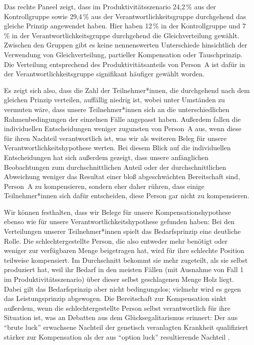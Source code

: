 \documentclass[justified,nobib,nohyper,symmetric,twoside]{tufte-book}
\begin{document}
Das rechte Paneel zeigt, dass im Produktivitätsszenario 24,2\,\% aus der Kontrollgruppe sowie 29,4\,\% aus der Verantwortlichkeitsgruppe durchgehend das gleiche Prinzip angewendet haben.
Hier haben 12\,\% in der Kontrollgruppe und 7\,\% in der Verantwortlichkeitsgruppe durchgehend die Gleichverteilung gewählt.
Zwischen den Gruppen gibt es keine nennenswerten Unterschiede hinsichtlich der Verwendung von Gleichverteilung, partieller Kompensation oder Tauschprinzip.
Die Verteilung entsprechend des Produktivitätsanteils von Person~A ist dafür in der Verantwortlichkeitsgruppe signifikant häufiger gewählt worden.

Es zeigt sich also, dass die Zahl der Teilnehmer*innen, die durchgehend nach dem gleichen Prinzip verteilen, auffällig niedrig ist, wobei unter Umständen zu vermuten wäre, dass unsere Teilnehmer*innen sich an die unterschiedlichen Rahmenbedingungen der einzelnen Fälle angepasst haben.
Außerdem fallen die individuellen Entscheidungen weniger zugunsten von Person~A aus, wenn diese für ihren Nachteil verantwortlich ist, was wir als weiteren Beleg für unsere Verantwortlichkeitshypothese werten.
Bei diesem Blick auf die individuellen Entscheidungen hat sich außerdem gezeigt, dass unsere anfänglichen Beobachtungen zum durchschnittlichen Anteil oder der durchschnittlichen Abweichung weniger das Resultat einer bloß abgeschwächten Bereitschaft sind, Person~A zu kompensieren, sondern eher daher rühren, dass einige Teilnehmer*innen sich dafür entscheiden, diese Person gar nicht zu kompensieren.

Wir können festhalten, dass wir Belege für unsere Kompensationshypothese ebenso wie für unsere Verantwortlichkeitshypothese gefunden haben: Bei den Verteilungen unserer Teilnehmer*innen spielt das Bedarfsprinzip eine deutliche Rolle.
Die schlechtergestellte Person, die also entweder mehr benötigt oder weniger zur verfügbaren Menge beigetragen hat, wird für ihre schlechte Position teilweise kompensiert.
Im Durchschnitt bekommt sie mehr zugeteilt, als sie selbst produziert hat, weil ihr Bedarf in den meisten Fällen (mit Ausnahme von Fall 1 im Produktivitätsszenario) über dieser selbst geschlagenen Menge Holz liegt.
Dabei gilt das Bedarfsprinzip aber nicht bedingungslos; vielmehr wird es gegen das Leistungsprinzip abgewogen.
Die Bereitschaft zur Kompensation sinkt außerdem, wenn die schlechtergestellte Person selbst verantwortlich für ihre Situation ist, was an Debatten aus dem Glücks\-egalitarismus erinnert: Der aus \enquote{brute luck} erwachsene Nachteil der genetisch veranlagten Krankheit qualifiziert stärker zur Kompensation als der aus \enquote{option luck} resultierende Nachteil \citep{dworkin_sovereign_2000}.
\end{document}
